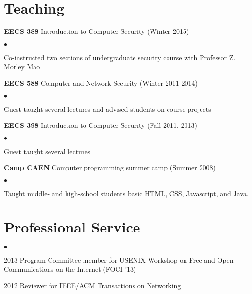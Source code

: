 \documentclass{res}
\newcommand{\sqitem}{\item[\tiny$\blacksquare$]}
\newcommand{\sqlist}{\begin{list}{$\bullet$}
  { \setlength{\itemsep}{0pt}
	\setlength{\parsep}{0pt}
	\setlength{\topsep}{0pt}
	\setlength{\partopsep}{0pt}
	\setlength{\leftmargin}{6.0em}
	\setlength{\labelsep}{2.5em} } }
\newcommand{\sqend}{\end{list}}
\begin{document}
\begin{resume}
\section{Teaching}
    \textbf{EECS 388} Introduction to Computer Security (Winter 2015)
        \sqlist
        \sqitem Co-instructed two sections of undergraduate security course with Professor Z. Morley Mao
        \sqend

    \textbf{EECS 588} Computer and Network Security (Winter 2011-2014)
        \sqlist
        \sqitem Guest taught several lectures and advised students on course projects
        \sqend

    \textbf{EECS 398} Introduction to Computer Security (Fall 2011, 2013)
        \sqlist
        \sqitem Guest taught several lectures
        \sqend

    \textbf{Camp CAEN} Computer programming summer camp (Summer 2008)
        \sqlist
        \sqitem Taught middle- and high-school students basic HTML, CSS, Javascript, and Java.
        \sqend

\section{Professional Service}
    \sqlist
    \sqitem 2013 Program Committee member for USENIX Workshop on Free and Open Communications on the Internet (FOCI '13)
    \sqitem 2012 Reviewer for IEEE/ACM Transactions on Networking
    \sqend


\end{resume}
\end{document}
